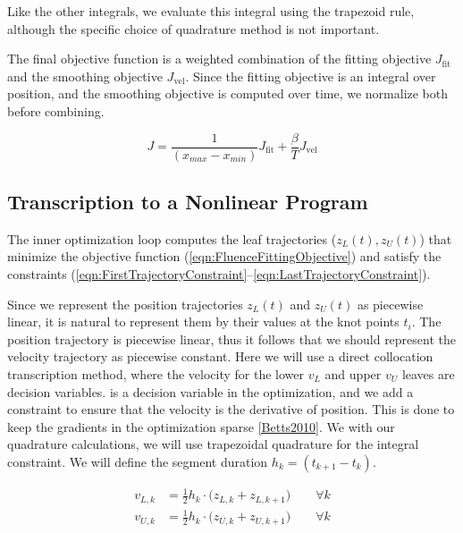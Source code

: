 Like the other integrals, we evaluate this integral using the trapezoid rule,
although the specific choice of quadrature method is not important.

The final objective function is a weighted combination of the
fitting objective $J_\text{fit}$ and the smoothing objective $J_\text{vel}$.
Since the fitting objective is an integral over position, and the smoothing objective
is computed over time, we normalize both before combining.

\begin{equation}
  J = \frac{1}{(x_{max} - x_{min})} J_\text{fit}
    + \frac{\beta}{T} J_\text{vel}
\label{eqn:FluenceFittingObjective}
\end{equation}

\subsection{Transcription to a Nonlinear Program}

The inner optimization loop computes the leaf trajectories ($z_L(t), z_U(t)$)
that minimize the objective function (\ref{eqn:FluenceFittingObjective})
and satisfy the constraints (\ref{eqn:FirstTrajectoryConstraint}--\ref{eqn:LastTrajectoryConstraint}).

Since we represent the position trajectories $z_L(t)$ and $z_U(t)$ as piecewise linear,
it is natural to represent them by their values at the knot points $t_i$.
The position trajectory is piecewise linear, thus it follows that we should represent the
velocity trajectory as piecewise constant.
Here we will use a direct collocation transcription method, where the velocity for the
lower $v_L$ and upper $v_U$ leaves are decision variables.
is a decision variable in the optimization,
and we add a constraint to ensure that the velocity is the derivative of position.
This is done to keep the gradients in the optimization sparse \ref{Betts2010}.
We with our quadrature calculations, we will use trapezoidal quadrature for the integral constraint.
We will define the segment duration $h_k = (t_{k+1} - t_k)$.

\begin{align}
  v_{L,k} & = \tfrac{1}{2} h_k \cdot  \big( z_{L, k} + z_{L, k+1} \big)
  \quad \quad \forall k\\
  v_{U,k} & = \tfrac{1}{2} h_k \cdot  \big( z_{U, k} + z_{U, k+1} \big)
  \quad \quad \forall k\\
\end{align}

